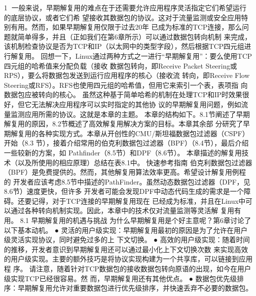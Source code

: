                                                      1
一般来说，早期解复用的难点在于还需要允许应用程序灵活指定它们希望运行的底层协议，或者它们希
望接收其数据包的协议。这对于流量监测或安全应用特别有用。然而，如果早期解复用仅限于过去20年
已成为标准的TCP连接，那么问题就简单得多，并且（正如我们在第6章所示）可以通过数据包转向机制
来完成，该机制检查协议是否为TCP和IP（以太网中的类型字段），然后根据TCP四元组进行解复用。
回想一下，Linux通过两种方式之一进行“早期解复用”：要么使用TCP四元组的哈希值来分配负载（接收
数据包转向，即Receive Packet Steering或RPS），要么将数据包发送到运行应用程序的核心（接收流
转向，即Receive Flow Steering或RFS）。RFS也使用四元组的哈希值，但用它来索引一个表，表项指
向数据包应被转向的核心。
虽然这种基于简单哈希的机制在处理TCP和IP时效果很好，但它无法解决应用程序可以实时指定的其他协
议的早期解复用问题，例如流量监测应用所需的协议。这就是本章的主题。
本章的结构如下。8.1节阐述了早期解复用的原因，8.2节概述了高效解复用解决方案的目标。本章其余部
分研究了早期解复用的各种实现方式。本章从开创性的CMU/斯坦福数据包过滤器（CSPF）开始（8.3
节），接着介绍常用的伯克利数据包过滤器（BPF）（8.4节），最后介绍一些较新的方案，如
Pathfinder（8.5节）和DPF（8.6节）。
本章描述的解复用技术（以及所使用的相应原理）总结在表8.1中。
快速参考指南
伯克利数据包过滤器（BPF）是免费提供的。然而，其他解复用算法效率更高。希望设计解复用例程的
开发者应该考虑8.5节中描述的PathFinder。虽然动态数据包过滤器（DPF，见8.6节）速度更快，但许多
开发者可能会发现DPF中动态代码生成的需求是一个障碍。还要记得，对于TCP连接的早期解复用现在
已经成为标准，并且在Linux中可以通过各种转向机制实现。因此，本章中的技术仅对流量监测等灵活解
复用有用。
8.1 早期解复用的机遇与挑战
为什么早期解复用是个好主意呢？第6章讨论了以下基本动机。
 ● 灵活的用户级实现：早期解复用最初的原因是为了允许在用户级灵活实现协议，同时避免过多的上
   下文切换。
 ● 高效的用户级实现：随着时间的推移，开发者意识到早期解复用还可以通过最小化上下文切换次数
   来实现高效的用户级实现。主要的额外技巧是将协议实现构建为一个共享库，可以链接到应用程
   序。
请注意，随着针对TCP数据包的接收数据包转向原语的出现，如今在用户级实现TCP已经很容易。然
而，早期解复用还有其他优点。
 ● 数据包优先级排序：早期解复用允许对重要数据包进行优先级排序，并快速丢弃不必要的数据包。


